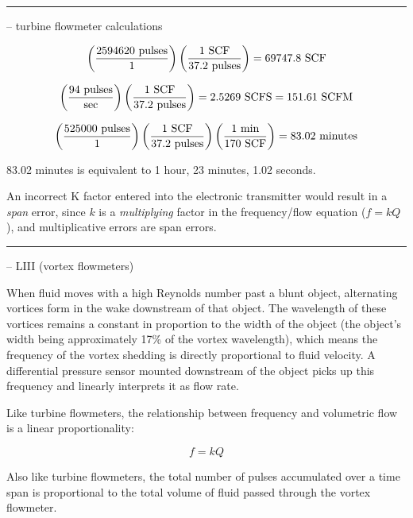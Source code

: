 \filbreak \vskip 5pt \hrule \vskip 5pt  -- turbine flowmeter calculations \vskip 10pt

$$\left({2594620 \hbox{ pulses} \over 1} \right) \left( {1 \hbox{ SCF} \over 37.2 \hbox{ pulses}} \right) = 69747.8 \hbox{ SCF}$$

\vskip 10pt

$$\left( {94 \hbox{ pulses} \over \hbox{sec}} \right) \left( {1 \hbox{ SCF} \over 37.2 \hbox{ pulses}} \right) = 2.5269 \hbox{ SCFS} = 151.61 \hbox{ SCFM}$$

\vskip 10pt

$$\left( {525000 \hbox{ pulses} \over 1} \right) \left( {1 \hbox{ SCF} \over 37.2 \hbox{ pulses}} \right) \left( {1 \hbox{ min} \over 170 \hbox{ SCF}} \right) = 83.02 \hbox{ minutes}$$

83.02 minutes is equivalent to 1 hour, 23 minutes, 1.02 seconds.

\vskip 10pt

An incorrect K factor entered into the electronic transmitter would result in a {\it span} error, since $k$ is a {\it multiplying} factor in the frequency/flow equation ($f = kQ$), and multiplicative errors are span errors.


\filbreak \vskip 5pt \hrule \vskip 5pt  -- LIII (vortex flowmeters) \vskip 10pt

When fluid moves with a high Reynolds number past a blunt object, alternating vortices form in the wake downstream of that object.  The wavelength of these vortices remains a constant in proportion to the width of the object (the object's width being approximately 17\% of the vortex wavelength), which means the frequency of the vortex shedding is directly proportional to fluid velocity.  A differential pressure sensor mounted downstream of the object picks up this frequency and linearly interprets it as flow rate.

\vskip 10pt

Like turbine flowmeters, the relationship between frequency and volumetric flow is a linear proportionality:

$$f = kQ$$

Also like turbine flowmeters, the total number of pulses accumulated over a time span is proportional to the total volume of fluid passed through the vortex flowmeter.

